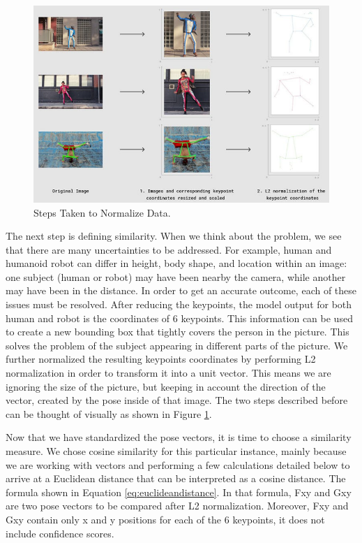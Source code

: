 \begin{figure}[ht]
\centering
\includegraphics[scale=0.52]{gambar/two-steps.png}
\caption{Steps Taken to Normalize Data.}
\label{fig:steps-to-normalize}
\end{figure}

The next step is defining similarity. When we think about the problem, we see that there are many uncertainties to be addressed. For example, human and humanoid robot can differ in height, body shape, and location within an image: one subject (human or robot) may have been nearby the camera,
while another may have been in the distance. In order to get an accurate outcome, each of these issues must be resolved.
After reducing the keypoints, the model output for both human and robot is the coordinates of 6 keypoints. This information can be used to create a new bounding box that tightly covers the person in the picture. 
This solves the problem of the subject appearing in different parts of the picture.
We further normalized the resulting keypoints coordinates by performing L2 normalization in order to transform it into a unit vector.
This means we are ignoring the size of the picture, but keeping in account the direction of the vector, created by the pose inside of that image.
The two steps described before can be thought of visually as shown in Figure \ref{fig:steps-to-normalize}.

Now that we have standardized the pose vectors, it is time to choose a similarity measure. We chose cosine similarity for this particular instance, mainly because we are working with vectors
and performing a few calculations detailed below to arrive at a Euclidean distance that can be interpreted as a cosine distance.
The formula shown in Equation \ref{eq:euclideandistance}.
In that formula, Fxy and Gxy are two pose vectors to be compared after L2 normalization. Moreover, Fxy and Gxy contain only x and y positions for each of the 6 keypoints, it does not include confidence scores.

